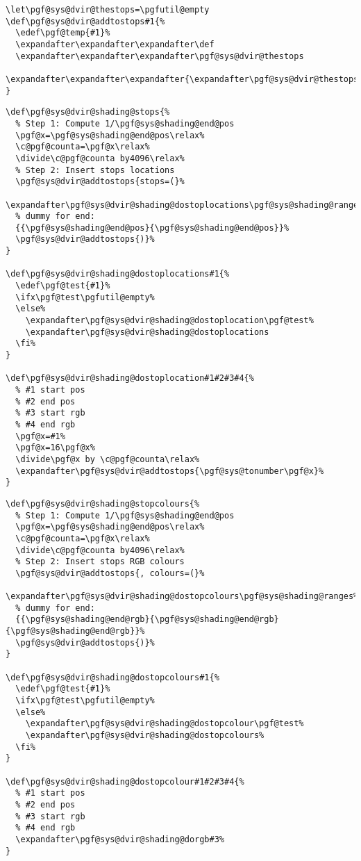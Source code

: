 \documentclass[]{article}
\begin{document}
\begin{verbatim}
\let\pgf@sys@dvir@thestops=\pgfutil@empty
\def\pgf@sys@dvir@addtostops#1{%
  \edef\pgf@temp{#1}%
  \expandafter\expandafter\expandafter\def
  \expandafter\expandafter\expandafter\pgf@sys@dvir@thestops
  \expandafter\expandafter\expandafter{\expandafter\pgf@sys@dvir@thestops\expandafter\space\pgf@temp}%
}
\end{verbatim}

\begin{verbatim}
\def\pgf@sys@dvir@shading@stops{%
  % Step 1: Compute 1/\pgf@sys@shading@end@pos
  \pgf@x=\pgf@sys@shading@end@pos\relax%
  \c@pgf@counta=\pgf@x\relax%
  \divide\c@pgf@counta by4096\relax%
  % Step 2: Insert stops locations 
  \pgf@sys@dvir@addtostops{stops=(}%
  \expandafter\pgf@sys@dvir@shading@dostoplocations\pgf@sys@shading@ranges%
  % dummy for end:
  {{\pgf@sys@shading@end@pos}{\pgf@sys@shading@end@pos}}%
  \pgf@sys@dvir@addtostops{)}%
}

\def\pgf@sys@dvir@shading@dostoplocations#1{%
  \edef\pgf@test{#1}%
  \ifx\pgf@test\pgfutil@empty%
  \else%
    \expandafter\pgf@sys@dvir@shading@dostoplocation\pgf@test%
    \expandafter\pgf@sys@dvir@shading@dostoplocations
  \fi%
}

\def\pgf@sys@dvir@shading@dostoplocation#1#2#3#4{%
  % #1 start pos
  % #2 end pos
  % #3 start rgb
  % #4 end rgb
  \pgf@x=#1%
  \pgf@x=16\pgf@x%
  \divide\pgf@x by \c@pgf@counta\relax%
  \expandafter\pgf@sys@dvir@addtostops{\pgf@sys@tonumber\pgf@x}%
}
\end{verbatim}

\begin{verbatim}
\def\pgf@sys@dvir@shading@stopcolours{%
  % Step 1: Compute 1/\pgf@sys@shading@end@pos
  \pgf@x=\pgf@sys@shading@end@pos\relax%
  \c@pgf@counta=\pgf@x\relax%
  \divide\c@pgf@counta by4096\relax%
  % Step 2: Insert stops RGB colours
  \pgf@sys@dvir@addtostops{, colours=(}%
  \expandafter\pgf@sys@dvir@shading@dostopcolours\pgf@sys@shading@ranges%
  % dummy for end:
  {{\pgf@sys@shading@end@rgb}{\pgf@sys@shading@end@rgb}{\pgf@sys@shading@end@rgb}}%
  \pgf@sys@dvir@addtostops{)}%
}

\def\pgf@sys@dvir@shading@dostopcolours#1{%
  \edef\pgf@test{#1}%
  \ifx\pgf@test\pgfutil@empty%
  \else%
    \expandafter\pgf@sys@dvir@shading@dostopcolour\pgf@test%
    \expandafter\pgf@sys@dvir@shading@dostopcolours%
  \fi%
}

\def\pgf@sys@dvir@shading@dostopcolour#1#2#3#4{%
  % #1 start pos
  % #2 end pos
  % #3 start rgb
  % #4 end rgb
  \expandafter\pgf@sys@dvir@shading@dorgb#3%
}
\end{verbatim}
\end{document}
